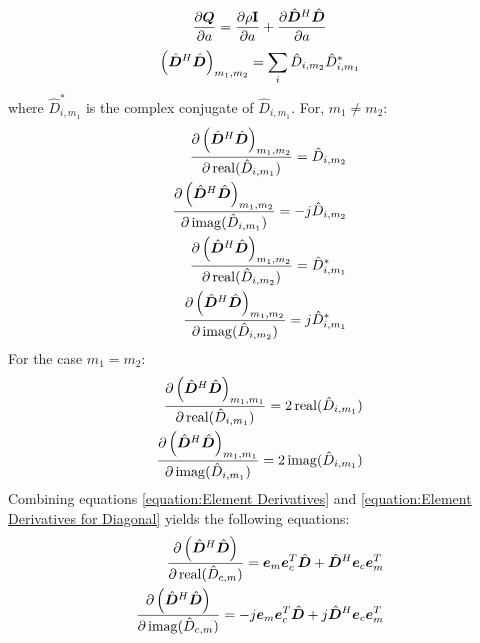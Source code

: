 \begin{appendices}
\begin{equation}
\frac{\partial \bm{Q}}{\partial a} = \frac{\partial \rho{\bf I}}{\partial a} + \frac{\partial \hat{\bm{D}}^H\hat{\bm{D}}}{\partial a} 
\end{equation}
\begin{equation}
\left(\hat{\bm{D}}^H\hat{\bm{D}}\right)_{m_1,m_2} = \sum_i \hat{D}_{i,m_2}\hat{D}_{i,m_1}^*
\end{equation}
where $\hat{D}_{i,m_1}^*$ is the complex conjugate of $\hat{D}_{i,m_1}$.
For, $m_1 \neq m_2$:
\begin{equation} \label{equation:Element Derivatives}
\begin{split}
\frac{\partial \left(\hat{\bm{D}}^H\hat{\bm{D}}\right)_{m_1,m_2}}{\partial 
\operatorname{real}(\hat{D}_{i,m_1})} = \hat{D}_{i,m_2} 
\\
\frac{\partial \left(\hat{\bm{D}}^H\hat{\bm{D}}\right)_{m_1,m_2}}{\partial \operatorname{imag}(\hat{D}_{i,m_1})} = -j\hat{D}_{i,m_2} 
\\
\frac{\partial \left(\hat{\bm{D}}^H\hat{\bm{D}}\right)_{m_1,m_2}}{\partial 
\operatorname{real}(\hat{D}_{i,m_2})} = \hat{D}_{i,m_1}^* 
\\
\frac{\partial \left(\hat{\bm{D}}^H\hat{\bm{D}}\right)_{m_1,m_2}}{\partial \operatorname{imag}(\hat{D}_{i,m_2})} = j\hat{D}_{i,m_1}^* 
\end{split}
\end{equation}
For the case $m_1 = m_2$:
\begin{equation}
\begin{split} \label{equation:Element Derivatives for Diagonal}
\frac{\partial \left(\hat{\bm{D}}^H\hat{\bm{D}}\right)_{m_1,m_1}}{\partial 
\operatorname{real}(\hat{D}_{i,m_1})} = 2
\operatorname{real}(\hat{D}_{i,m_1})
\\
\frac{\partial \left(\hat{\bm{D}}^H\hat{\bm{D}}\right)_{m_1,m_1}}{\partial \operatorname{imag}(\hat{D}_{i,m_1})} = 2\operatorname{imag}(\hat{D}_{i,m_1})
\end{split}
\end{equation}
Combining equations \ref{equation:Element Derivatives} and \ref{equation:Element Derivatives for Diagonal} yields the following equations:
\begin{equation}
\begin{split}
\frac{\partial \left(\hat{\bm{D}}^H\hat{\bm{D}}\right)}{\partial 
\operatorname{real}(\hat{D}_{c,m})} = \bm{e}_m\bm{e}_c^T\hat{\bm{D}} + \hat{\bm{D}}^H\bm{e}_c\bm{e}_m^T
\\
\frac{\partial \left(\hat{\bm{D}}^H\hat{\bm{D}}\right)}{\partial \operatorname{imag}(\hat{D}_{c,m})} = -j\bm{e}_m\bm{e}_c^T\hat{\bm{D}} + j\hat{\bm{D}}^H\bm{e}_c\bm{e}_m^T
\end{split}
\end{equation}

\end{appendices}
